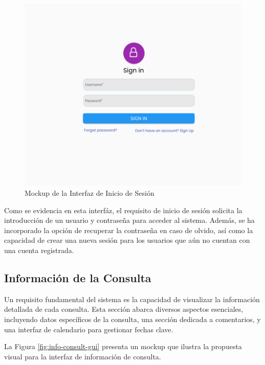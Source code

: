 \begin{figure}[H]
    \centering
    \includegraphics[width=1\linewidth]{fig/signin.png}
    \caption{Mockup de la Interfaz de Inicio de Sesión}
    \label{fig:signin}
\end{figure}

Como se evidencia en esta interfáz, el requisito de inicio de sesión solicita la introducción de un usuario y contraseña para acceder al sistema. Además, se ha incorporado la opción de recuperar la contraseña en caso de olvido, así como la capacidad de crear una nueva sesión para los usuarios que aún no cuentan con una cuenta registrada.


\subsection{Información de la Consulta}

Un requisito fundamental del sistema es la capacidad de visualizar la información detallada de cada consulta. Esta sección abarca diversos aspectos esenciales, incluyendo datos específicos de la consulta, una sección dedicada a comentarios, y una interfaz de calendario para gestionar fechas clave.

La Figura \ref{fig:info-consult-gui} presenta un mockup que ilustra la propuesta visual para la interfaz de información de consulta.

